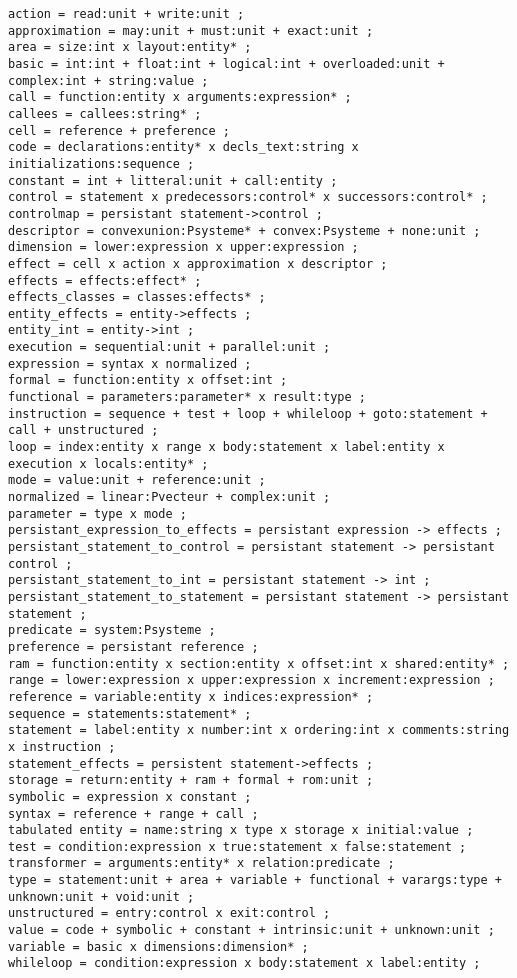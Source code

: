 \documentclass[a4paper]{report}
\begin{document}
\begin{verbatim}
action = read:unit + write:unit ;
approximation = may:unit + must:unit + exact:unit ;
area = size:int x layout:entity* ;
basic = int:int + float:int + logical:int + overloaded:unit + complex:int + string:value ;
call = function:entity x arguments:expression* ;
callees = callees:string* ;
cell = reference + preference ;
code = declarations:entity* x decls_text:string x initializations:sequence ;
constant = int + litteral:unit + call:entity ;
control = statement x predecessors:control* x successors:control* ;
controlmap = persistant statement->control ;
descriptor = convexunion:Psysteme* + convex:Psysteme + none:unit ;
dimension = lower:expression x upper:expression ;
effect = cell x action x approximation x descriptor ;
effects = effects:effect* ;
effects_classes = classes:effects* ;
entity_effects = entity->effects ;
entity_int = entity->int ;
execution = sequential:unit + parallel:unit ;
expression = syntax x normalized ;
formal = function:entity x offset:int ;
functional = parameters:parameter* x result:type ;
instruction = sequence + test + loop + whileloop + goto:statement + call + unstructured ;
loop = index:entity x range x body:statement x label:entity x execution x locals:entity* ;
mode = value:unit + reference:unit ;
normalized = linear:Pvecteur + complex:unit ;
parameter = type x mode ;
persistant_expression_to_effects = persistant expression -> effects ;
persistant_statement_to_control = persistant statement -> persistant control ;
persistant_statement_to_int = persistant statement -> int ;
persistant_statement_to_statement = persistant statement -> persistant statement ;
predicate = system:Psysteme ;
preference = persistant reference ;
ram = function:entity x section:entity x offset:int x shared:entity* ;
range = lower:expression x upper:expression x increment:expression ;
reference = variable:entity x indices:expression* ;
sequence = statements:statement* ;
statement = label:entity x number:int x ordering:int x comments:string x instruction ;
statement_effects = persistent statement->effects ;
storage = return:entity + ram + formal + rom:unit ;
symbolic = expression x constant ;
syntax = reference + range + call ;
tabulated entity = name:string x type x storage x initial:value ;
test = condition:expression x true:statement x false:statement ;
transformer = arguments:entity* x relation:predicate ;
type = statement:unit + area + variable + functional + varargs:type + unknown:unit + void:unit ;
unstructured = entry:control x exit:control ;
value = code + symbolic + constant + intrinsic:unit + unknown:unit ;
variable = basic x dimensions:dimension* ;
whileloop = condition:expression x body:statement x label:entity ;
\end{verbatim}
\end{document}
